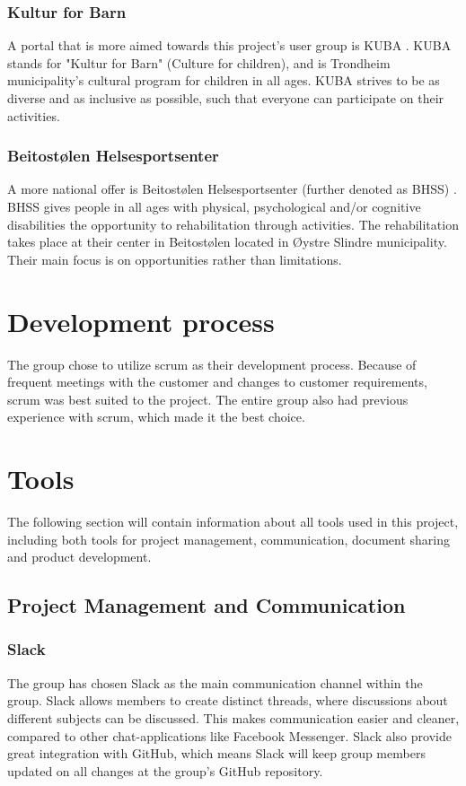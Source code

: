 \subsubsection{Kultur for Barn}
A portal that is more aimed towards this project's user group is KUBA \cite{KUBA}. KUBA stands for "Kultur for Barn" (Culture for children), and is Trondheim municipality's cultural program for children in all ages. KUBA strives to be as diverse and as inclusive as possible, such that everyone can participate on their activities.

\subsubsection{Beitostølen Helsesportsenter}
A more national offer is Beitostølen Helsesportsenter (further denoted as BHSS) \cite{BHSS}. BHSS gives people in all ages with physical, psychological and/or cognitive disabilities the opportunity to rehabilitation through activities. The rehabilitation takes place at their center in Beitostølen located in Øystre Slindre municipality. Their main focus is on opportunities rather than limitations.  


\section{Development process}
The group chose to utilize scrum as their development process. Because of frequent meetings with the customer and changes to customer requirements, scrum was best suited to the project.  The entire group also had previous experience with scrum, which made it the best choice.

\section{Tools}
\label{tools}
The following section will contain information about all tools used in this project, including both tools for project management, communication, document sharing and product development.

\subsection{Project Management and Communication}

\subsubsection{Slack}
The group has chosen Slack \cite{Slack} as the main communication channel within the group. Slack allows members to create distinct threads, where discussions about different subjects can be discussed. This makes communication easier and cleaner, compared to other chat-applications like Facebook Messenger. Slack also provide great integration with GitHub, which means Slack will keep group members updated on all changes at the group's GitHub repository. 


